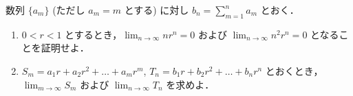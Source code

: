 \documentclass[../../main.tex]{subfiles}
\begin{document}
数列 $\{a_m\}$ (ただし $a_m = m$ とする) に対し $\displaystyle b_n = \sum_{m=1}^{n} a_m$ とおく．
\begin{enumerate}
  \item $0 < r < 1$ とするとき，$\displaystyle \lim_{n \to \infty} nr^n = 0$ および $\displaystyle \lim_{n \to \infty} n^2r^n = 0$ となることを証明せよ．
  \item $S_m = a_1r + a_2r^2 + \dots + a_mr^m$, $T_n = b_1r + b_2r^2 + \dots + b_nr^n$ とおくとき，
    $\displaystyle \lim_{m \to \infty} S_m$ および $\displaystyle \lim_{n \to \infty} T_n$ を求めよ．
\end{enumerate}
\end{document}
